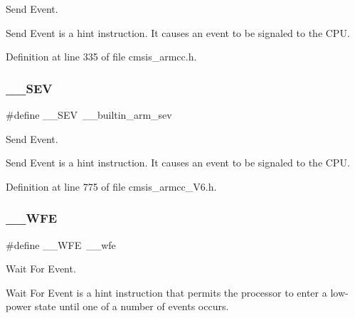 Send Event. 

Send Event is a hint instruction. It causes an event to be signaled to the C\+PU. 

Definition at line 335 of file cmsis\+\_\+armcc.\+h.

\mbox{\label{group___c_m_s_i_s___core___instruction_interface_gaab4f296d0022b4b10dc0976eb22052f9}} 
\subsubsection{\texorpdfstring{\+\_\+\+\_\+\+S\+EV}{\_\_SEV}\hspace{0.1cm}{\footnotesize\ttfamily [2/2]}}
{\footnotesize\ttfamily \#define \+\_\+\+\_\+\+S\+EV~\+\_\+\+\_\+builtin\+\_\+arm\+\_\+sev}



Send Event. 

Send Event is a hint instruction. It causes an event to be signaled to the C\+PU. 

Definition at line 775 of file cmsis\+\_\+armcc\+\_\+\+V6.\+h.

\mbox{\label{group___c_m_s_i_s___core___instruction_interface_gaac6cc7dd4325d9cb40d3290fa5244b3d}} 
\subsubsection{\texorpdfstring{\+\_\+\+\_\+\+W\+FE}{\_\_WFE}\hspace{0.1cm}{\footnotesize\ttfamily [1/2]}}
{\footnotesize\ttfamily \#define \+\_\+\+\_\+\+W\+FE~\+\_\+\+\_\+wfe}



Wait For Event. 

Wait For Event is a hint instruction that permits the processor to enter a low-\/power state until one of a number of events occurs. 

